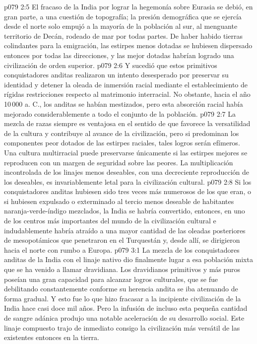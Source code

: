 \vs p079 2:5 El fracaso de la India por lograr la hegemonía sobre Eurasia se debió, en gran parte, a una cuestión de topografía; la presión demográfica que se ejercía desde el norte solo empujó a la mayoría de la población al sur, al menguante territorio de Decán, rodeado de mar por todas partes. De haber habido tierras colindantes para la emigración, las estirpes menos dotadas se hubiesen dispersado entonces por todas las direcciones, y las mejor dotadas habrían logrado una civilización de orden superior.
\vs p079 2:6 Y sucedió que estos primitivos conquistadores anditas realizaron un intento desesperado por preservar su identidad y detener la oleada de inmersión racial mediante el establecimiento de rígidas restricciones respecto al matrimonio interracial. No obstante, hacia el año 10\,000 a. C., los anditas se habían mestizados, pero esta absorción racial había mejorado considerablemente a todo el conjunto de la población.
\vs p079 2:7 \pc La mezcla de razas siempre es ventajosa en el sentido de que favorece la versatilidad de la cultura y contribuye al avance de la civilización, pero si predominan los componentes peor dotados de las estirpes raciales, tales logros serán efímeros. Una cultura multirracial puede preservarse únicamente si las estirpes mejores se reproducen con un margen de seguridad sobre las peores. La multiplicación incontrolada de los linajes menos deseables, con una decreciente reproducción de los deseables, es invariablemente letal para la civilización cultural.
\vs p079 2:8 Si los conquistadores anditas hubiesen sido tres veces más numerosos de los que eran, o si hubiesen expulsado o exterminado al tercio menos deseable de habitantes naranja\hyp{}verde\hyp{}índigo mezclados, la India se habría convertido, entonces, en uno de los centros más importantes del mundo de la civilización cultural e indudablemente habría atraído a una mayor cantidad de las oleadas posteriores de mesopotámicos que penetraron en el Turquestán y, desde allí, se dirigieron hacia el norte con rumbo a Europa.
\vs p079 3:1 La mezcla de los conquistadores anditas de la India con el linaje nativo dio finalmente lugar a esa población mixta que se ha venido a llamar dravidiana. Los dravidianos primitivos y más puros poseían una gran capacidad para alcanzar logros culturales, que se fue debilitando constantemente conforme su herencia andita se iba atenuando de forma gradual. Y esto fue lo que hizo fracasar a la incipiente civilización de la India hace casi doce mil años. Pero la infusión de incluso esta pequeña cantidad de sangre adánica produjo una notable aceleración de su desarrollo social. Este linaje compuesto trajo de inmediato consigo la civilización más versátil de las existentes entonces en la tierra.
